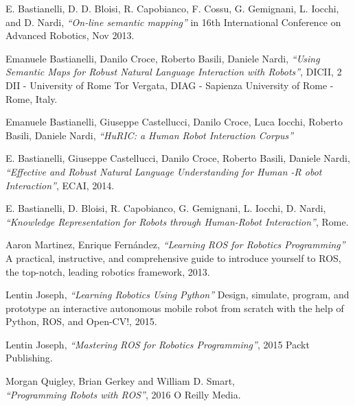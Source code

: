 \documentclass[a4paper, 12pt]{article}
\numberwithin{equation}{section}
\begin{document}
\listoffigures


\begin{thebibliography}{11}
	
	 E. Bastianelli, D. D. Bloisi, R. Capobianco, F. Cossu,
G. Gemignani, L. Iocchi, and D. Nardi,
            \emph{``On-line semantic mapping''} in 16th International Conference on Advanced
Robotics, Nov 2013.

	 Emanuele Bastianelli, Danilo Croce, Roberto Basili, Daniele Nardi,
            \emph{``Using Semantic Maps for Robust Natural Language Interaction with Robots''}, DICII, 2 DII - University of Rome Tor Vergata, DIAG - Sapienza University of Rome - Rome, Italy.

	 Emanuele Bastianelli, Giuseppe Castellucci, Danilo Croce, Luca Iocchi, Roberto Basili, Daniele Nardi,
            \emph{``HuRIC: a Human Robot Interaction Corpus''} 

	 E. Bastianelli, Giuseppe Castellucci, Danilo Croce, Roberto Basili, Daniele Nardi,
            \emph{``Effective and Robust Natural Language Understanding
for Human -R obot Interaction''}, ECAI, 2014.
	
	 E. Bastianelli, D. Bloisi, R. Capobianco, G. Gemignani, L. Iocchi, D. Nardi,
            \emph{``Knowledge Representation for Robots through
Human-Robot Interaction''}, Rome.

	 Aaron Martinez, Enrique Fern\'andez,
            \emph{``Learning ROS for Robotics Programming''} A practical, instructive, and comprehensive guide to introduce yourself to ROS, the top-notch, leading robotics framework, 2013.
            
     Lentin Joseph,
            \emph{``Learning Robotics Using Python''} Design, simulate, program, and prototype an interactive autonomous mobile robot from scratch with the help of Python, ROS, and Open-CV!, 2015.
            
     Lentin Joseph,
            \emph{``Mastering ROS for Robotics Programming''}, 2015 Packt Publishing.
                  
     Morgan Quigley, Brian Gerkey and William D. Smart,\\
            \emph{``Programming Robots with ROS''}, 2016 O Reilly Media.
                     

\end{thebibliography}
\end{document}

